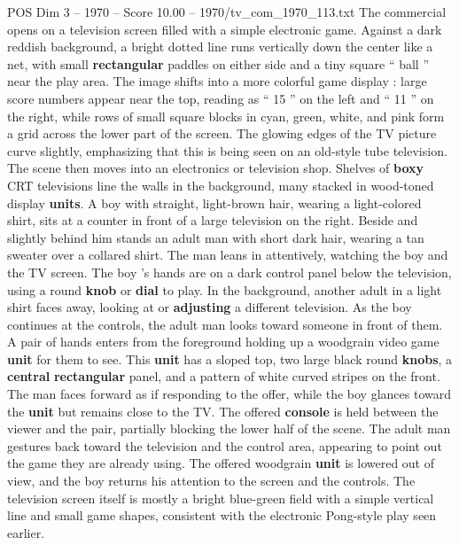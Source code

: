 \begin{textsample}{POS Dim 3 – 1970 – Score 10.00 – 1970/tv\_com\_1970\_113.txt}  \label{ex:f3_pos_032}
The commercial opens on a television screen filled with a simple electronic game.
Against a dark reddish background, a bright dotted line runs vertically down the center like a net, with small \textbf{rectangular} paddles on either side and a tiny square “ ball ” near the play area.
The image shifts into a more colorful game display : large score numbers appear near the top, reading as “ 15 ” on the left and “ 11 ” on the right, while rows of small square blocks in cyan, green, white, and pink form a grid across the lower part of the screen.
The glowing edges of the TV picture curve slightly, emphasizing that this is being seen on an old-style tube television.
The scene then moves into an electronics or television shop.
Shelves of \textbf{boxy} CRT televisions line the walls in the background, many stacked in wood-toned display \textbf{units}.
A boy with straight, light-brown hair, wearing a light-colored shirt, sits at a counter in front of a large television on the right.
Beside and slightly behind him stands an adult man with short dark hair, wearing a tan sweater over a collared shirt.
The man leans in attentively, watching the boy and the TV screen.
The boy ’s hands are on a dark control panel below the television, using a round \textbf{knob} or \textbf{dial} to play.
In the background, another adult in a light shirt faces away, looking at or \textbf{adjusting} a different television.
As the boy continues at the controls, the adult man looks toward someone in front of them.
A pair of hands enters from the foreground holding up a woodgrain video game \textbf{unit} for them to see.
This \textbf{unit} has a sloped top, two large black round \textbf{knobs}, a \textbf{central} \textbf{rectangular} panel, and a pattern of white curved stripes on the front.
The man faces forward as if responding to the offer, while the boy glances toward the \textbf{unit} but remains close to the TV.
The offered \textbf{console} is held between the viewer and the pair, partially blocking the lower half of the scene.
The adult man gestures back toward the television and the control area, appearing to point out the game they are already using.
The offered woodgrain \textbf{unit} is lowered out of view, and the boy returns his attention to the screen and the controls.
The television screen itself is mostly a bright blue-green field with a simple vertical line and small game shapes, consistent with the electronic Pong-style play seen earlier.

\end{textsample}
